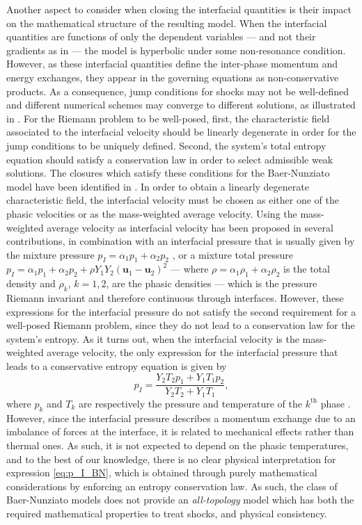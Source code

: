 \documentclass{myclass}
\newcommand{\vel}{\bm{u}}
\begin{document}
Another aspect to consider when closing the interfacial quantities is their impact on the mathematical structure of the resulting model. When the interfacial quantities are functions of only the dependent variables --- and not their gradients as in \cite{saurel:2003,perrier:2021}--- the model is hyperbolic under some non-resonance condition. However, as these interfacial quantities define the inter-phase momentum and energy exchanges, they appear in the governing equations as non-conservative products. As a consequence, jump conditions for shocks may not be well-defined and different numerical schemes may converge to different solutions, as illustrated in \cite{guillemaud:2007}. For the Riemann problem to be well-posed, first, the characteristic field associated to the interfacial velocity should be linearly degenerate in order for the jump conditions to be uniquely defined. Second, the system's total entropy equation should satisfy a conservation law in order to select admissible weak solutions. The closures which satisfy these conditions for the Baer-Nunziato model have been identified in \cite{gallouet:2004}. In order to obtain a linearly degenerate characteristic field, the interfacial velocity must be chosen as either one of the phasic velocities or as the mass-weighted average velocity.
Using the mass-weighted average velocity as interfacial velocity has been proposed in several contributions, in combination with an interfacial pressure that is usually given by the mixture pressure $p_I = \alpha_1 p_1 + \alpha_2 p_2$ \cite{saurel:1999}, or a mixture total pressure $p_I = \alpha_1 p_1 + \alpha_2 p_2 + \rho Y_1 Y_2 (\vel_1 - \vel_2)^2$ \cite{saurel:2001} --- where $\rho=\alpha_1 \rho_1 + \alpha_2 \rho_2$ is the total density and $\rho_k$, $k=1,2$, are the phasic densities --- which is the pressure Riemann invariant and therefore continuous through interfaces. However, these expressions for the interfacial pressure do not satisfy the second requirement for a well-posed Riemann problem, since they do not lead to a conservation law for the system's entropy. As it turns out, when the interfacial velocity is the mass-weighted average velocity, the only expression for the interfacial pressure that leads to a conservative entropy equation is given by
\begin{equation}
p_I = \frac{Y_2 T_2 p_1 + Y_1 T_1 p_2}{Y_2 T_2 + Y_1 T_1},
\label{eq:p_I_BN}
\end{equation}
where $p_k$ and $T_k$ are respectively the pressure and temperature of the $k^\text{th}$ phase \cite{gallouet:2004}. However, since the interfacial pressure describes a momentum exchange due to an imbalance of forces at the interface, it is related to mechanical effects rather than thermal ones. As such, it is not expected to depend on the phasic temperatures, and to the best of our knowledge, there is no clear physical interpretation for expression \eqref{eq:p_I_BN}, which is obtained through purely mathematical considerations by enforcing an entropy conservation law. As such, the class of Baer-Nunziato models does not provide an \textit{all-topology} model which has both the required mathematical properties to treat shocks, and physical consistency.
\end{document}
